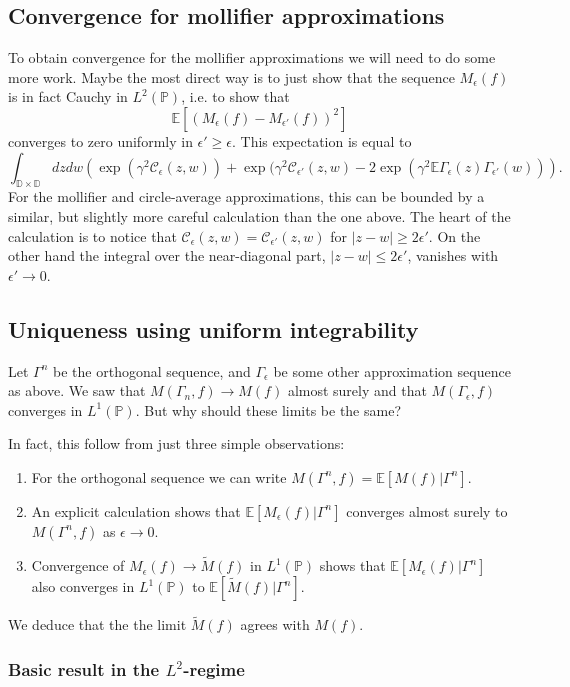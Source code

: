 \documentclass[11pt]{amsart}
\newcommand{\C}{\mathcal C}
\newcommand{\D}{\mathbb D}
\newcommand{\E}{\mathbb E}
\renewcommand{\P}{\mathbb P}
\renewcommand{\1}{\mathbf 1}
\newcommand{\eps}{\epsilon}
\begin{document}
\subsection*{Convergence for mollifier approximations}
To obtain convergence for the mollifier approximations we will need to do some more work. Maybe the most direct way is to just show that the sequence $M_\eps(f)$ is in fact Cauchy in $L^2(\P)$, i.e. to show that
$$\E\left[(M_{\eps}(f)-M_{\eps'}(f))^2\right]$$
converges to zero uniformly in $\eps' \geq \eps$. This expectation is equal to
$$\int_{\D \times \D}dzdw\left(\exp(\gamma^2\C_\eps(z,w)) + \exp(\gamma^2 \C_{\eps'}(z,w) - 2\exp(\gamma^2\E \Gamma_\eps(z) \Gamma_{\eps'}(w))\right).$$
For the mollifier and circle-average approximations, this can be bounded by a similar, but slightly more careful calculation than the one above. The heart of the calculation is to notice that $\C_\eps(z,w) = \C_{\eps'}(z,w)$ for $|z-w| \geq 2\eps'$. On the other hand the integral over the near-diagonal part, $|z-w| \leq 2\eps'$, vanishes with $\eps' \to 0$.

\subsection*{Uniqueness using uniform integrability}

Let $\Gamma^n$ be the orthogonal sequence, and $\Gamma_\eps$ be some other approximation sequence as above. We saw that $M(\Gamma_n,f) \to M(f)$ almost surely and that $M(\Gamma_\eps,f)$ converges in $L^1(\P)$. But why should these limits be the same? 

In fact, this follow from just three simple observations:

\begin{enumerate}
\item For the orthogonal sequence we can write $M(\Gamma^n,f) = \E\left[M(f) | \Gamma^n\right]$.
\item An explicit calculation shows that $\E \left[M_{\eps}(f) | \Gamma^n\right]$ converges almost surely to $M(\Gamma^n, f)$ as $\eps \to 0$. 
\item Convergence of $M_{\eps}(f) \to \tilde M(f)$ in $L^1(\P)$ shows that $\E \left[M_{\eps}(f) | \Gamma^n\right]$ also converges in $L^1(\P)$ to $\E \left[\tilde M(f) | \Gamma^n\right]$. 
\end{enumerate}

We deduce that the the limit $\tilde M(f)$ agrees with $M(f)$. 

\subsubsection*{Basic result in the $L^2$-regime}
\end{document}
